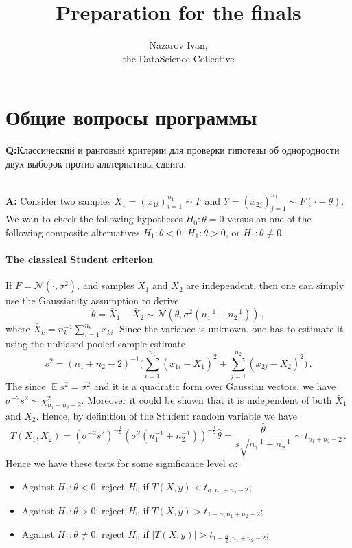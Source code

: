 \documentclass[a4paper,14pt]{extarticle}
\title{Preparation for the finals}
\author{Nazarov Ivan, \rus{101мНОД(ИССА)}\\the DataScience Collective}
\newcommand{\Ncal}{\mathcal{N}}
\newcommand{\ex}{\mathop{\mathbb{E}}\nolimits}
\newcommand{\rus}[1]{\foreignlanguage{russian}{#1}}
\begin{document}
\maketitle


\section{\rus{Общие вопросы программы}} %
\label{sec:general_questions}
\noindent\textbf{Q:}\rus{Классический и ранговый критерии для проверки гипотезы об
однородности двух выборок против альтернативы сдвига.}

\hfill\\\noindent\textbf{A:}
Consider two samples $X_1=(x_{1i})_{i=1}^{n_1}\sim F$ and $Y=(x_{2j})_{j=1}^{n_1}
\sim F(\cdot - \theta)$. We wan to check the following hypotheses $H_0: \theta=0$
versus an one of the following composite alternatives $H_1:\theta < 0$, $H_1:\theta > 0$,
or $H_1:\theta \neq 0$.

\paragraph{The classical Student criterion} %
\label{par:the_classical_student_criterion}

If $F = \Ncal(\cdot, \sigma^2)$, and samples $X_1$ and $X_2$ are independent, then
one can simply use the Gaussianity assumption to derive
$$ \hat{\theta} = \bar{X}_1 - \bar{X}_2
    \sim \Ncal(\theta, \sigma^2 (n_1^{-1} + n_2^{-1}))
    \,, $$
where $\bar{X}_k = n_k^{-1} \sum_{i=1}^{n_k} x_{ki}$. Since the variance is unknown,
one has to estimate it using the unbiased pooled sample estimate
$$ s^2
    = (n_1 + n_2 - 2)^{-1}\bigl(
        \sum_{i=1}^{n_1} (x_{1i} - \bar{X}_1)^2
        + \sum_{j=1}^{n_2} (x_{2j}- \bar{X}_2)^2
        \bigr)
    \,. $$
The since $\ex s^2 = \sigma^2$ and it is a quadratic form over Gaussian vectors,
we have $\sigma^{-2} s^2 \sim \chi^2_{n_1 + n_2 - 2}$. Moreover it could be shown
that it is independent of both $\bar{X}_1$ and $\bar{X}_2$. Hence, by definition
of the Student random variable we have
$$ T(X_1, X_2)
    = (\sigma^{-2} s^2)^{-\frac{1}{2}}
      (\sigma^2 (n_1^{-1} + n_2^{-1}))^{-\frac{1}{2}} \hat{\theta}
    = \frac{\hat{\theta}}{s \sqrt{n_1^{-1} + n_2^{-1}}}
    \sim t_{n_1 + n_2 - 2}
    \,. $$
Hence we have these tests for some significance level $\alpha$:\begin{itemize}
    \item Against $H_1:\theta < 0$: reject $H_0$ if $T(X, y) < t_{\alpha, n_1 + n_2 - 2}$;
    \item Against $H_1:\theta > 0$: reject $H_0$ if $T(X, y) > t_{1-\alpha, n_1 + n_2 - 2}$;
    \item Against $H_1:\theta \neq 0$: reject $H_0$ if $|T(X, y)| > t_{1-\frac{\alpha}{2}, n_1 + n_2 - 2}$;
\end{itemize}
\end{document}
